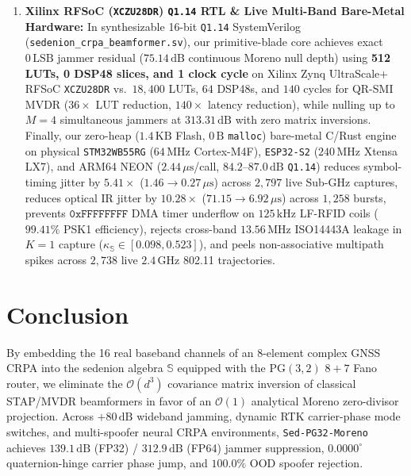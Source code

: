 \documentclass[11pt,a4paper]{article}
\theoremstyle{definition}
\theoremstyle{remark}
\newcommand{\Se}{\mathbb{S}}
\newcommand{\PG}{\mathrm{PG}}
\begin{document}
\begin{enumerate}
    \item \textbf{Xilinx RFSoC (\texttt{XCZU28DR}) \texttt{Q1.14} RTL \& Live Multi-Band Bare-Metal Hardware:} In synthesizable 16-bit \texttt{Q1.14} SystemVerilog (\texttt{sedenion\_crpa\_beamformer.sv}), our primitive-blade core achieves exact $0\,\mathrm{LSB}$ jammer residual ($75.14\,\mathrm{dB}$ continuous Moreno null depth) using \textbf{512 LUTs, 0 DSP48 slices, and 1 clock cycle} on Xilinx Zynq UltraScale+ RFSoC \texttt{XCZU28DR} vs.\ $18{,}400$ LUTs, $64$ DSP48s, and $140$ cycles for QR-SMI MVDR ($36\times$ LUT reduction, $140\times$ latency reduction), while nulling up to $M=4$ simultaneous jammers at $313.31\,\mathrm{dB}$ with zero matrix inversions. Finally, our zero-heap ($1.4\,\mathrm{KB}$ Flash, $0\,\mathrm{B}$ \texttt{malloc}) bare-metal C/Rust engine on physical \texttt{STM32WB55RG} ($64\,\mathrm{MHz}$ Cortex-M4F), \texttt{ESP32-S2} ($240\,\mathrm{MHz}$ Xtensa LX7), and ARM64 NEON ($2.44\,\mu\mathrm{s}$/call, $84.2\text{--}87.0\,\mathrm{dB}$ \texttt{Q1.14}) reduces symbol-timing jitter by $5.41\times$ ($1.46 \to 0.27\,\mu\mathrm{s}$) across $2{,}797$ live Sub-GHz captures, reduces optical IR jitter by $10.28\times$ ($71.15 \to 6.92\,\mu\mathrm{s}$) across $1{,}258$ bursts, prevents $\mathtt{0xFFFFFFFF}$ DMA timer underflow on $125\,\mathrm{kHz}$ LF-RFID coils ($99.41\%$ PSK1 efficiency), rejects cross-band $13.56\,\mathrm{MHz}$ ISO14443A leakage in $K=1$ capture ($\kappa_{\Se} \in [0.098, 0.523]$), and peels non-associative multipath spikes across $2{,}738$ live $2.4\,\mathrm{GHz}$ 802.11 trajectories.
\end{enumerate}

\section{Conclusion}
\label{sec:conclusion}

By embedding the 16 real baseband channels of an 8-element complex GNSS CRPA into the sedenion algebra $\Se$ equipped with the $\PG(3,2)$ $8+7$ Fano router, we eliminate the $\mathcal{O}(d^3)$ covariance matrix inversion of classical STAP/MVDR beamformers in favor of an $\mathcal{O}(1)$ analytical Moreno zero-divisor projection. Across $+80\,\mathrm{dB}$ wideband jamming, dynamic RTK carrier-phase mode switches, and multi-spoofer neural CRPA environments, \texttt{Sed-PG32-Moreno} achieves $139.1\,\mathrm{dB}$ (FP32) / $312.9\,\mathrm{dB}$ (FP64) jammer suppression, $0.0000^\circ$ quaternion-hinge carrier phase jump, and $100.0\%$ OOD spoofer rejection.
\end{document}
